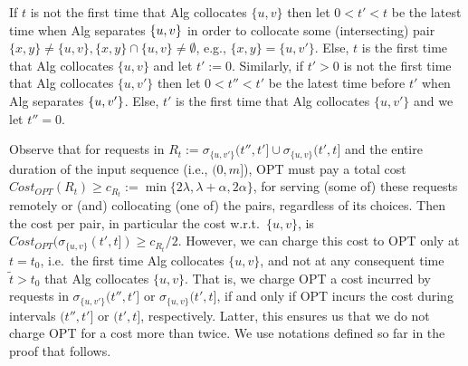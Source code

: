 \documentclass[manuscript,screen=true, review, anonymous]{acmart}
\DeclarePairedDelimiter\set{\{}{\}}
\begin{document}
If $t$ is not the first time that Alg collocates $\{u,v\}$ then
let $0 < t' < t$ be the latest time when Alg separates $\set{u,v}$
in order to collocate some (intersecting) pair
$\{x,y\} \neq \{u,v\}, \{x,y\} \cap \{u,v\} \neq \emptyset$, 
e.g.,
$\{x,y\}=\{u,v'\}$.
Else,
$t$ is the first time that Alg collocates $\{u,v\}$ and let $t' := 0$.
Similarly,
if $t' > 0$ is not the first time that Alg  collocates $\{u,v'\}$ 
then let $0 < t'' < t'$ be the latest time before $t'$ when Alg separates $\set{u,v'}$.
Else,
$t'$ is the first time that Alg collocates $\{u,v'\}$ and we let $t''=0$.
%

Observe that for requests in
$R_t := \sigma_{\{u,v'\}}(t'',t'] \cup \sigma_{\{u,v\}}(t',t]$ 
and the entire duration of the input sequence (i.e., $(0,m]$),
OPT must pay a total cost
$\mathit{Cost}_{\mathit{OPT}} (R_t) \geq 
	c_{R_t} := \min{ \{ 2\lambda, \lambda+\alpha, 2\alpha \} }$,
for serving (some of) these requests remotely or (and) collocating (one of) the pairs,
regardless of its choices.
Then the cost per pair, in particular the cost w.r.t.~$\{u,v\}$, is
$\mathit{Cost}_{\mathit{OPT}} (\sigma_{\{u,v\}}(t',t]) \geq c_{R_t} / 2$.
%
However,
we can charge this cost to OPT only at $t=t_0$,
i.e.~the first time Alg collocates $\{u,v\}$,
and not at any consequent time $\tilde{t} > t_0$ that Alg collocates $\{u,v\}$.
That is,
we charge OPT a cost incurred by requests in
$\sigma_{\{u,v'\}}(t'',t']$ or $\sigma_{\{u,v\}}(t',t]$,
if and only if  OPT incurs the cost during  intervals $(t'', t']$ or $(t', t]$,
respectively.	
Latter,
this ensures us that we do not charge OPT for a cost more than twice.
We use notations defined so far in the proof that follows.
\end{document}

